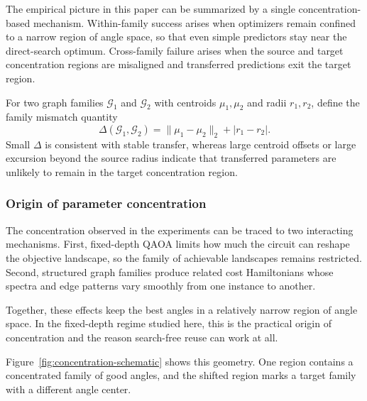 \documentclass[
  reprint,
  twocolumn,
  aps,
  superscriptaddress,
  longbibliography,
  floatfix
]{revtex4-2}
\begin{document}
The empirical picture in this paper can be summarized by a single concentration-based mechanism. Within-family success arises when optimizers remain confined to a narrow region of angle space, so that even simple predictors stay near the direct-search optimum. Cross-family failure arises when the source and target concentration regions are misaligned and transferred predictions exit the target region.

For two graph families $\mathcal{G}_1$ and $\mathcal{G}_2$ with centroids $\mu_1,\mu_2$ and radii $r_1,r_2$, define the family mismatch quantity
\begin{equation}
\Delta(\mathcal{G}_1,\mathcal{G}_2) = \|\mu_1 - \mu_2\|_2 + |r_1-r_2|.
\end{equation}
Small $\Delta$ is consistent with stable transfer, whereas large centroid offsets or large excursion beyond the source radius indicate that transferred parameters are unlikely to remain in the target concentration region.

\subsubsection{Origin of parameter concentration}

The concentration observed in the experiments can be traced to two interacting mechanisms. First, fixed-depth QAOA limits how much the circuit can reshape the objective landscape, so the family of achievable landscapes remains restricted. Second, structured graph families produce related cost Hamiltonians whose spectra and edge patterns vary smoothly from one instance to another.

Together, these effects keep the best angles in a relatively narrow region of angle space. In the fixed-depth regime studied here, this is the practical origin of concentration and the reason search-free reuse can work at all.

Figure~\ref{fig:concentration-schematic} shows this geometry. One region contains a concentrated family of good angles, and the shifted region marks a target family with a different angle center.
\end{document}
